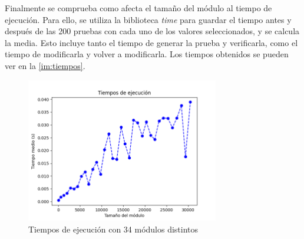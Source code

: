 Finalmente se comprueba como afecta el tamaño del módulo al tiempo de ejecución. Para ello, se utiliza la biblioteca \emph{time} para guardar el tiempo antes y después de las 200 pruebas con cada uno de los valores seleccionados, y se calcula la media. Esto incluye tanto el tiempo de generar la prueba y verificarla, como el tiempo de modificarla y volver a modificarla. Los tiempos obtenidos se pueden ver en la \autoref{im:tiempos}.

\begin{figure}[ht]
    \centering
    \includegraphics[width=0.75\textwidth]{images/tiempos.png}
    \caption{Tiempos de ejecución con 34 módulos distintos}
    \label{im:tiempos}
\end{figure}

